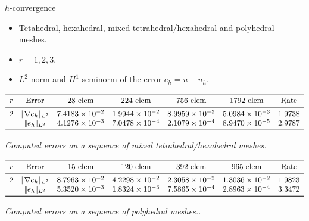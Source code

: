 \documentclass{beamer}
\begin{document}
\begin{frame}{$h$-convergence}
	\begin{itemize}
		\item Tetahedral, hexahedral, mixed tetrahedral/hexahedral and
		polyhedral meshes.
		\item $r = 1,2,3$.
		\item $L^2$-norm and $H^1$-seminorm of the error $e_h = u - u_h$.
	\end{itemize}

	\begin{table} \tiny
		\centering
		\[
		\begin{array}{ccccccc}
		\toprule
		r & \text{Error} & \text{28 elem} & \text{224 elem} & \text{756 elem} &
		\text{1792 elem} & \text{Rate} \\
		\midrule
		2 & |\!|\nabla e_{h}|\!|_{L^2} & 7.4183 \times 10^{-2} & 1.9944 \times
		10^{-2} & 8.9959 \times 10^{-3} & 5.0984 \times 10^{-3} & 1.9738\\
		& |\!|e_{h}|\!|_{L^2} & 4.1276 \times 10^{-3} & 7.0478 \times 10^{-4} &
		2.1079 \times 10^{-4} &
		8.9470 \times 10^{-5} & 2.9787\\
		\bottomrule
		\end{array}
		\]
		\caption{\textit{Computed errors on a sequence of mixed
		tetrahedral/hexahedral meshes.}}
	\[
	\begin{array}{ccccccc}
	\toprule
	r & \text{Error} & \text{15 elem} & \text{120 elem} & \text{392 elem} &
	\text{965 elem} & \text{Rate} \\
	\midrule
	2 & |\!|\nabla e_{h}|\!|_{L^2} & 8.7963 \times 10^{-2} & 4.2298 \times
	10^{-2} & 2.3058 \times 10^{-2} & 1.3036 \times 10^{-2} & 1.9823\\
	& |\!|e_{h}|\!|_{L^2} & 5.3520 \times 10^{-3} & 1.8324 \times 10^{-3} &
	7.5865 \times 10^{-4} & 2.8963 \times 10^{-4} & 3.3472\\
	\bottomrule
	\end{array}
	\]
	\caption{\textit{Computed errors on a sequence of polyhedral meshes..}}
\end{table}

\end{frame}
\end{document}
